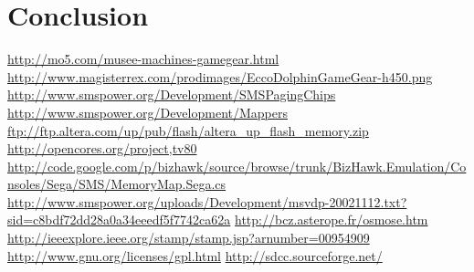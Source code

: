 \documentclass{article}
\begin{document}
\section{Conclusion}

\newpage
\begin{thebibliography}{9}
     \url{http://mo5.com/musee-machines-gamegear.html}
     \url{http://www.magisterrex.com/prodimages/EccoDolphinGameGear-h450.png}
     \url{http://www.smspower.org/Development/SMSPagingChips}
     \url{http://www.smspower.org/Development/Mappers}
     \url{ftp://ftp.altera.com/up/pub/flash/altera_up_flash_memory.zip}
     \url{http://opencores.org/project,tv80}
     \url{http://code.google.com/p/bizhawk/source/browse/trunk/BizHawk.Emulation/Consoles/Sega/SMS/MemoryMap.Sega.cs}
     \url{http://www.smspower.org/uploads/Development/msvdp-20021112.txt?sid=c8bdf72dd28a0a34eeedf5f7742ca62a}
     \url{http://bcz.asterope.fr/osmose.htm}
     \url{http://ieeexplore.ieee.org/stamp/stamp.jsp?arnumber=00954909}
     \url{http://www.gnu.org/licenses/gpl.html}
     \url{http://sdcc.sourceforge.net/}
\end{thebibliography}
\end{document}
